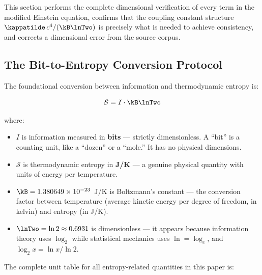 This section performs the complete dimensional verification of every
term in the modified Einstein equation, confirms that the coupling
constant structure $\kappatilde\,c^4/(\kB\lnTwo)$ is precisely what is
needed to achieve consistency, and corrects a dimensional error from the
source corpus.

\subsection{The Bit-to-Entropy Conversion Protocol}
\label{subsec:bit_conversion}

The foundational conversion between information and thermodynamic entropy is:

\begin{equation}
    \mathcal{S} = I\cdot\kB\lnTwo
    \label{eq:bit_conversion}
\end{equation}

\noindent where:
\begin{itemize}
    \item $I$ is information measured in \textbf{bits} ---
    strictly dimensionless. A ``bit'' is a counting unit, like a
    ``dozen'' or a ``mole.'' It has no physical dimensions.

    \item $\mathcal{S}$ is thermodynamic entropy in \textbf{J/K} ---
    a genuine physical quantity with units of energy per temperature.

    \item $\kB = 1.380649\times10^{-23}$~J/K is Boltzmann's constant
    --- the conversion factor between temperature (average kinetic energy
    per degree of freedom, in kelvin) and entropy (in J/K).

    \item $\lnTwo = \ln 2 \approx 0.6931$ is dimensionless --- it appears
    because information theory uses $\log_2$ while statistical mechanics
    uses $\ln = \log_e$, and $\log_2 x = \ln x / \ln 2$.
\end{itemize}

The complete unit table for all entropy-related quantities in this
paper is:


